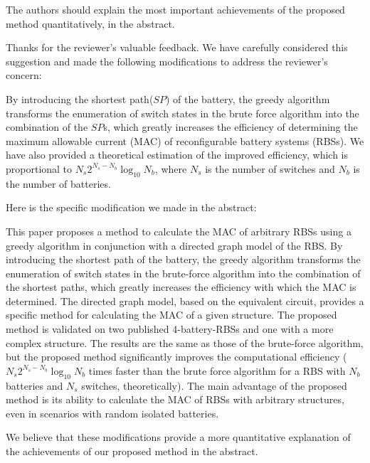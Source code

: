 \reviewer
\begin{revcomment}
  The authors should explain the most important achievements of the proposed method quantitatively, in the abstract.
\end{revcomment}
\begin{revresponse}

Thanks for the reviewer's valuable feedback. We have carefully considered this suggestion and made the following modifications to address the reviewer's concern:


By introducing the shortest path($SP$) of the battery, the greedy algorithm transforms the enumeration of switch states in the brute force algorithm into the combination of the $SP$s, which greatly increases the efficiency of determining the maximum allowable current (MAC) of reconfigurable battery systems (RBSs). We have also provided a theoretical estimation of the improved efficiency, which is proportional to $N_s 2^{N_s - N_b} \log_{10} N_b$, where $N_s$ is the number of switches and $N_b$ is the number of batteries.


Here is the specific modification we made in the abstract:
\begin{changes}
  
This paper proposes a method to calculate the MAC of arbitrary RBSs using a greedy algorithm in conjunction with a directed graph model of the RBS.
By introducing the shortest path of the battery, the greedy algorithm transforms the enumeration of switch states in the brute-force algorithm into the combination of the shortest paths, which greatly increases the efficiency with which the MAC is determined.
The directed graph model, based on the equivalent circuit, provides a specific method for calculating the MAC of a given structure.
The proposed method is validated on two published 4-battery-RBSs and one with a more complex structure.
The results are the same as those of the brute-force algorithm, but the proposed method significantly improves the computational efficiency ($N_s 2^{N_s - N_b} \log_{10} N_b$ times faster than the brute force algorithm for a RBS with $N_b$ batteries and $N_s$ switches, theoretically).
The main advantage of the proposed method is its ability to calculate the MAC of RBSs with arbitrary structures, even in scenarios with random isolated batteries.
\end{changes}


We believe that these modifications provide a more quantitative explanation of the achievements of our proposed method in the abstract. 

\end{revresponse}

